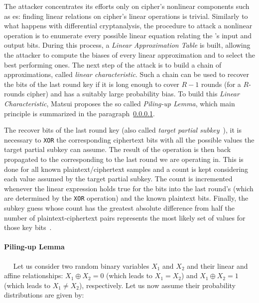             The attacker concentrates its efforts only on cipher's nonlinear components such as \sbocs{}es: finding linear relations on cipher's linear operations is trivial. Similarly to what happens with differential cryptanalysis, the procedure to attack a nonlinear operation is to enumerate every possible linear equation relating the \sbocs{}'s input and output bits. During this process, a \emph{Linear Approximation Table} is built, allowing the attacker to compute the biases of every linear approximation and to select the best performing ones.
            The next step of the attack is to build a chain of approximations, called \emph{linear characteristic}. Such a chain can be used to recover the bits of the last round key if it is long enough to cover $R - 1$ rounds (for a $R$-rounds cipher) and has a suitably large probability bias.
            To build this \emph{Linear Characteristic}, Matsui proposes the so called \emph{Piling-up Lemma}, which main principle is summarized in the paragraph~\ref{par:pilinglemma}.

            The recover bits of the last round key (also called \emph{target partial subkey}~\cite{heys2002tutorial}), it is necessary to \texttt{XOR} the corresponding ciphertext bits with all the possible values the target partial subkey can assume. The result of the operation is then back propagated to the \sbocs{} corresponding to the last round we are operating in. This is done for all known plaintext/ciphertext samples and a count is kept considering each value assumed by the target partial subkey. The count is incremented whenever the linear expression holds true for the bits into the last round’s \sbocs{} (which are determined by the \texttt{XOR} operation) and the known plaintext bits. Finally, the subkey guess whose count has the greatest absolute difference from half the number of plaintext-ciphertext pairs represents the most likely set of values for those key bits~\cite{heys2002tutorial}.

            \paragraph{Piling-up Lemma}\label{par:pilinglemma}~\cite{matsui1993linear}~\cite{heys2002tutorial}
            Let us consider two random binary variables $X_1$ and $X_2$ and their linear and affine relationships: $X_1 \oplus X_2 = 0$ (which leads to $X_1 = X_2$) and $X_1 \oplus X_2 = 1$ (which leads to $X_1 \neq X_2$), respectively. Let us now assume their probability distributions are given by:

